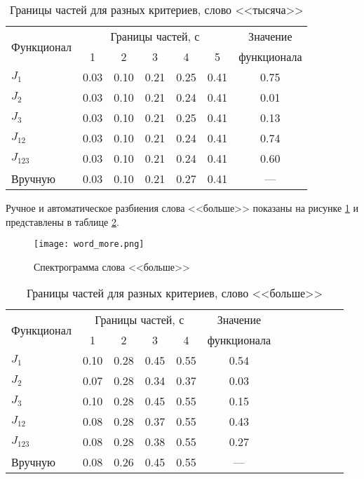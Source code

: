 \begin{table}[h]
	\centering
	\caption{Границы частей для разных критериев, слово <<тысяча>>}
	\label{tab:results_1000}
	\begin{tabular}{| l | c | c | c | c | c | c |}
		\hline
		\multirow{2}{*}{Функционал} & \multicolumn{5}{c|}{Границы частей, с} & Значение \\
		\hhline{~-----~} & \phantom{00} 1 \phantom{00} & \phantom{00} 2 \phantom{00} & \phantom{00} 3 \phantom{00} & \phantom{00} 4 \phantom{00} & \phantom{00} 5 \phantom{00} & \phantom{00}функционала\phantom{00} \\
		\hline
		$J_{1}$		& 0.03 & 0.10 & 0.21 & 0.25 & 0.41 & 0.75 \\
		$J_{2}$		& 0.03 & 0.10 & 0.21 & 0.24 & 0.41 & 0.01 \\
		$J_{3}$		& 0.03 & 0.10 & 0.21 & 0.25 & 0.41 & 0.13 \\
		$J_{12}$	& 0.03 & 0.10 & 0.21 & 0.24 & 0.41 & 0.74 \\
		$J_{123}$	& 0.03 & 0.10 & 0.21 & 0.24 & 0.41 & 0.60 \\
		\hline
		Вручную		& 0.03 & 0.10 & 0.21 & 0.27 & 0.41 & --- \\
		\hline
	\end{tabular}
\end{table}

Ручное и автоматическое разбиения слова <<больше>> показаны на рисунке \ref{fig:word_more} и представлены в таблице \ref{tab:results_more}.

\begin{figure}[h]
	\centering
 	\texttt{[image: word\_more.png]}
	\caption{Спектрограмма слова <<больше>>}
	\label{fig:word_more}
\end{figure}

\begin{table}[h]
	\centering
	\caption{Границы частей для разных критериев, слово <<больше>>}
	\label{tab:results_more}
	{\normalsize
		\begin{tabular}{| l | c | c | c | c | c | c | c | c | c | c | c |}
			\hline
			\multirow{2}{*}{Функционал} & \multicolumn{4}{c|}{Границы частей, с} & Значение \\
			\hhline{~----~} & \phantom{000} 1 \phantom{000} & \phantom{000} 2 \phantom{000} & \phantom{000} 3 \phantom{000} & \phantom{000} 4 \phantom{000} & \phantom{00}функционала\phantom{00} \\
			\hline
			$J_{1}$		& 0.10 & 0.28 & 0.45 & 0.55 & 0.54 \\
			$J_{2}$		& 0.07 & 0.28 & 0.34 & 0.37 & 0.03 \\
			$J_{3}$		& 0.10 & 0.28 & 0.45 & 0.55 & 0.15 \\
			$J_{12}$	& 0.08 & 0.28 & 0.37 & 0.55 & 0.43 \\
			$J_{123}$	& 0.08 & 0.28 & 0.38 & 0.55 & 0.27 \\
			\hline
			Вручную		& 0.08 & 0.26 & 0.45 & 0.55 & --- \\
			\hline
		\end{tabular}
	}
\end{table}

